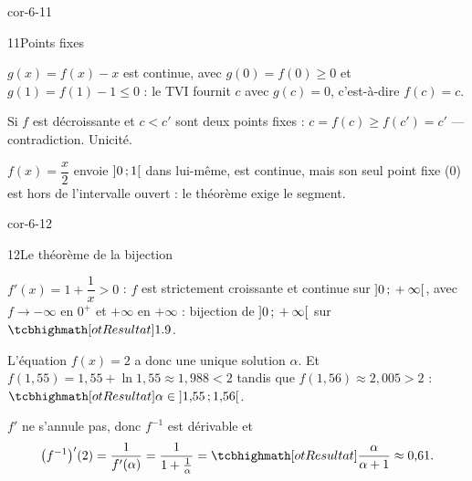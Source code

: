 \begin{blocLivre}{cor-6-11}
\begin{corrige}{11}{Points fixes}
\begin{questions}
  \item $g(x)=f(x)-x$ est continue, avec $g(0)=f(0)\geq0$ et
    $g(1)=f(1)-1\leq0$ : le TVI fournit $c$ avec $g(c)=0$, c'est-à-dire
    $f(c)=c$.
  \item Si $f$ est décroissante et $c<c'$ sont deux points fixes :
    $c=f(c)\geq f(c')=c'$ — contradiction. Unicité.
  \item $f(x)=\dfrac{x}{2}$ envoie $\mathopen{]}0\,{;}\,1\mathclose{[}$ dans lui-même, est
    continue, mais son seul point fixe ($0$) est hors de l'intervalle
    ouvert : le théorème exige le segment.
\end{questions}
\end{corrige}
\end{blocLivre}

\begin{blocLivre}{cor-6-12}
\begin{corrige}{12}{Le théorème de la bijection}
\begin{questions}
  \item $f'(x)=1+\dfrac1x>0$ : $f$ est strictement croissante et continue
    sur $\mathopen{]}0\,{;}\,+\infty\mathclose{[}$, avec $f\to-\infty$ en $0^{+}$ et $+\infty$ en
    $+\infty$ : bijection de $\mathopen{]}0\,{;}\,+\infty\mathclose{[}$ sur $\res{\R}$.
  \item L'équation $f(x)=2$ a donc une unique solution $\alpha$. Et
    $f(1{,}55)=1{,}55+\ln1{,}55\approx1{,}988<2$ tandis que
    $f(1{,}56)\approx2{,}005>2$ : $\res{\alpha\in\intOO{1{,}55}{1{,}56}}$.
  \item $f'$ ne s'annule pas, donc $f^{-1}$ est dérivable et
    \[
      \bigl(f^{-1}\bigr)'(2)=\frac{1}{f'(\alpha)}=\frac{1}{1+\frac1\alpha}
      =\res{\frac{\alpha}{\alpha+1}}\approx0{,}61.
    \]
\end{questions}
\end{corrige}
\end{blocLivre}

